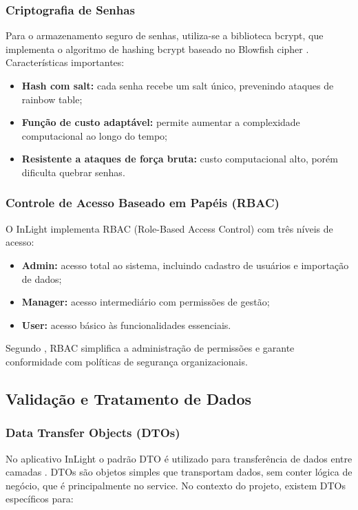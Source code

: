 \subsubsection{Criptografia de Senhas}

Para o armazenamento seguro de senhas, utiliza-se a biblioteca bcrypt, que implementa o algoritmo de hashing bcrypt baseado no Blowfish cipher \cite{provos1999}. Características importantes:

\begin{itemize}
    \item \textbf{Hash com salt:} cada senha recebe um salt único, prevenindo ataques de rainbow table;
    \item \textbf{Função de custo adaptável:} permite aumentar a complexidade computacional ao longo do tempo;
    \item \textbf{Resistente a ataques de força bruta:} custo computacional alto, porém dificulta quebrar senhas.
\end{itemize}

\subsubsection{Controle de Acesso Baseado em Papéis (RBAC)}

O InLight implementa RBAC (Role-Based Access Control) com três níveis de acesso:

\begin{itemize}
    \item \textbf{Admin:} acesso total ao sistema, incluindo cadastro de usuários e importação de dados;
    \item \textbf{Manager:} acesso intermediário com permissões de gestão;
    \item \textbf{User:} acesso básico às funcionalidades essenciais.
\end{itemize}

Segundo \cite{ferraiolo2001}, RBAC simplifica a administração de permissões e garante conformidade com políticas de segurança organizacionais.

\subsection{Validação e Tratamento de Dados}

\subsubsection{Data Transfer Objects (DTOs)}
No aplicativo InLight o padrão DTO é utilizado para transferência de dados entre camadas \cite{fowler2002}. DTOs são objetos simples que transportam dados, sem conter lógica de negócio, que é principalmente no service. No contexto do projeto, existem DTOs específicos para:

